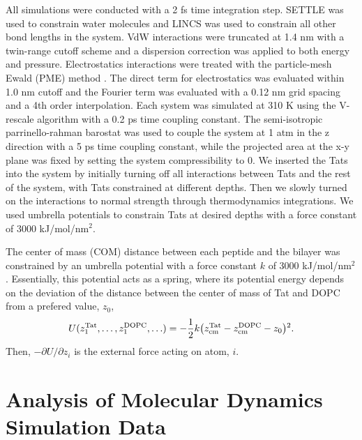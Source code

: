 All simulations were conducted with a 2 fs time integration step. SETTLE \cite{Miyamoto92} was used
to constrain water molecules and LINCS \cite{Hess97} was used to constrain all other bond lengths in the
system. VdW interactions were truncated at 1.4 nm with a twin-range cutoff scheme and a
dispersion correction was applied to both energy and pressure. Electrostatics interactions were
treated with the particle-mesh Ewald (PME) method \cite{Darden93}. The direct term for electrostatics was
evaluated within 1.0 nm cutoff and the Fourier term was evaluated with a 0.12 nm grid spacing
and a 4th order interpolation. Each system was simulated at 310 K using the V-rescale
algorithm \cite{Bussi07} with a 0.2 ps time coupling constant. The semi-isotropic parrinello-rahman barostat
\cite{Parrinello81} was used to couple the system at 1 atm in the z direction with a 5 ps time coupling constant,
while the projected area at the x-y plane was fixed by setting the system compressibility to 0.
We inserted the Tats into the system by initially turning off all interactions between Tats and the
rest of the system, with Tats constrained at different depths. Then we slowly turned on the
interactions to normal strength through thermodynamics integrations. We used umbrella
potentials to constrain Tats at desired depths with a force constant of 3000 kJ/mol/nm$^2$.

The center of mass (COM) distance between each peptide and the bilayer was 
constrained by an umbrella potential with a force constant $k$ of 3000 kJ/mol/nm$^2$. 
Essentially, this potential acts as a spring, 
where its potential energy depends on the deviation of the distance 
between the center of mass of Tat and DOPC from a prefered value, $z_0$,
\begin{equation*}
  U(z_1^{\textrm{Tat}},\ldots,z_1^{\textrm{DOPC}},\ldots) = 
  -\frac{1}{2} k 
  \mathopen{}\left( z_{\textrm{cm}}^{\textrm{Tat}} - z_{\textrm{cm}}^{\textrm{DOPC}} - z_0 \right)\mathclose{}^2.
\end{equation*}
Then, $-\partial U/\partial z_i$ is the external force acting 
on atom, $i$. 

\newpage
\section{Analysis of Molecular Dynamics Simulation Data}

